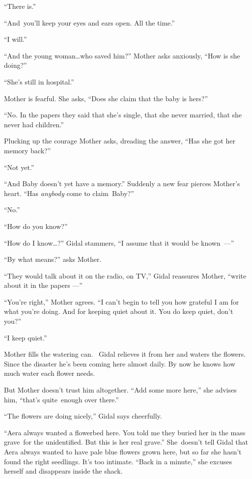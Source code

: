 \documentclass[twoside,11pt,openany]{book}
\begin{document}
``There is.''

``And~you'll keep your eyes and ears open. All the time.''

``I will.''

``And the young woman{\ldots}who saved him?'' Mother asks anxiously, ``How is she
doing?''

``She's still in hospital.''

Mother is fearful.  She asks, ``Does she claim{ }that the baby is hers?''

``No. In the papers they said that she's single, that she never married, that she never had
children.''

Plucking up the courage Mother asks, dreading the answer,
``Has she got her memory back?''

``Not yet.''

``And Baby doesn't yet have a memory.'' Suddenly a new fear pierces Mother's heart.
``Has \textit{anybody }come to claim~Baby?''

``No.''

``How do you know?''

``How do I know{\ldots}?'' Gidal stammers, ``I assume that it would be
\hbox{known ---''}

``By what means?'' asks Mother.

``They would talk about it on the radio, on TV,'' Gidal reassures Mother, ``write
 about it in the papers ---''

``You're right,'' Mother agrees. ``I can't begin to tell you how grateful I am
for what you're doing. And for keeping quiet about it. You do keep quiet, don't you?''

``I keep quiet.''

Mother fills the watering can. ~Gidal relieves it from her and waters the flowers. Since the disaster he's been coming
here almost daily. By now he knows how much water each flower needs.

But Mother doesn't trust him altogether. ``Add some more here,'' she advises him,
``that's quite~enough over there.''

``The flowers are doing nicely,'' Gidal says cheerfully.

``Aera always wanted a flowerbed here. You told me they buried her in the mass grave~for the unidentified.
But this is her real grave.'' She~doesn't tell Gidal that Aera always wanted to have pale blue flowers
grown here, but so far she hasn't found the right seedlings. It's too intimate. ``Back in a
minute,'' she excuses herself and disappears inside the shack.
\end{document}
